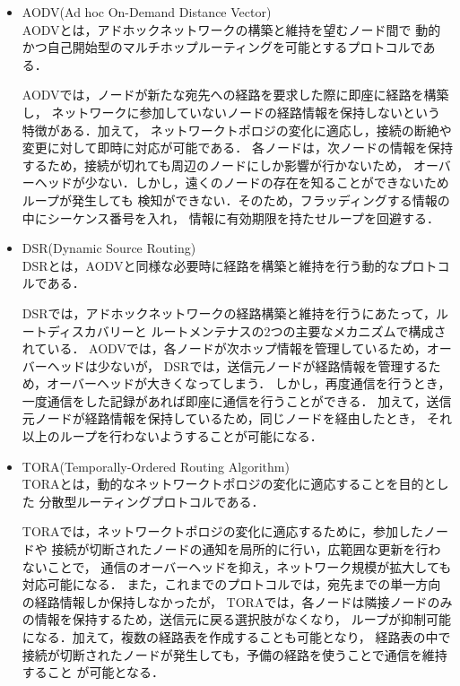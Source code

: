 \documentclass[a4paper, 11pt]{ltjsarticle}
\begin{document}
\begin{itemize}
  \item AODV(Ad hoc On-Demand Distance Vector)\cite{AODV} \\
  AODVとは，アドホックネットワークの構築と維持を望むノード間で
  動的かつ自己開始型のマルチホップルーティングを可能とするプロトコルである．
  
  AODVでは，ノードが新たな宛先への経路を要求した際に即座に経路を構築し，
  ネットワークに参加していないノードの経路情報を保持しないという特徴がある．加えて，
  ネットワークトポロジの変化に適応し，接続の断絶や変更に対して即時に対応が可能である．
  各ノードは，次ノードの情報を保持するため，接続が切れても周辺のノードにしか影響が行かないため，
  オーバーヘッドが少ない．しかし，遠くのノードの存在を知ることができないためループが発生しても
  検知ができない．そのため，フラッディングする情報の中にシーケンス番号を入れ，
  情報に有効期限を持たせループを回避する．\\
  
  \item DSR(Dynamic Source Routing)\cite{DSR} \\
  DSRとは，AODVと同様な必要時に経路を構築と維持を行う動的なプロトコルである．

  DSRでは，アドホックネットワークの経路構築と維持を行うにあたって，ルートディスカバリーと
  ルートメンテナスの2つの主要なメカニズムで構成されている．
  AODVでは，各ノードが次ホップ情報を管理しているため，オーバーヘッドは少ないが，
  DSRでは，送信元ノードが経路情報を管理するため，オーバーヘッドが大きくなってしまう．
  しかし，再度通信を行うとき，一度通信をした記録があれば即座に通信を行うことができる．
  加えて，送信元ノードが経路情報を保持しているため，同じノードを経由したとき，
  それ以上のループを行わないようすることが可能になる．\\
  
  \item TORA(Temporally-Ordered Routing Algorithm)\cite{TORA} \\
  TORAとは，動的なネットワークトポロジの変化に適応することを目的とした
  分散型ルーティングプロトコルである．

  TORAでは，ネットワークトポロジの変化に適応するために，参加したノードや
  接続が切断されたノードの通知を局所的に行い，広範囲な更新を行わないことで，
  通信のオーバーヘッドを抑え，ネットワーク規模が拡大しても対応可能になる．
  また，これまでのプロトコルでは，宛先までの単一方向の経路情報しか保持しなかったが，
  TORAでは，各ノードは隣接ノードのみの情報を保持するため，送信元に戻る選択肢がなくなり，
  ループが抑制可能になる．加えて，複数の経路表を作成することも可能となり，
  経路表の中で接続が切断されたノードが発生しても，予備の経路を使うことで通信を維持すること
  が可能となる．\\


\end{itemize}
\end{document}
